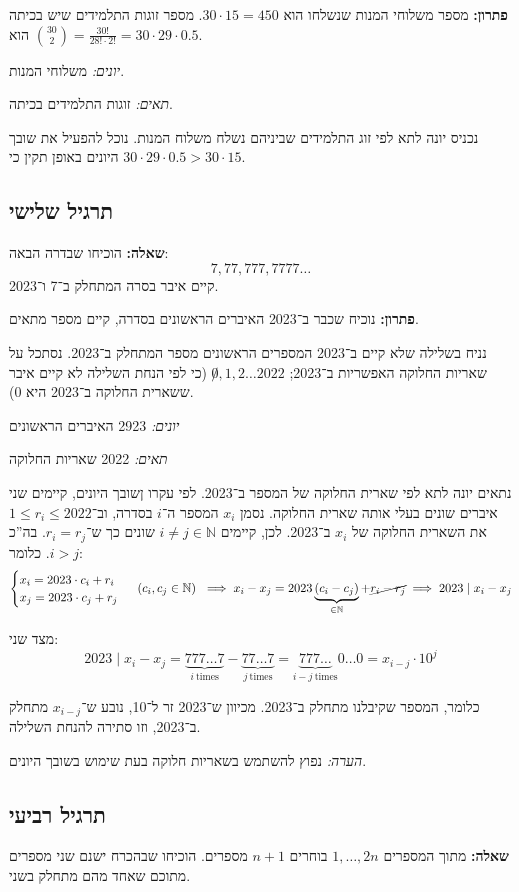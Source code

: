 \documentclass[]{article}
\newcommand\N     {\mathbb{N}}
\begin{document}
	\textbf{פתרון: }מספר משלוחי המנות שנשלחו הוא $30 \cdot 15 = 450$. מספר זוגות התלמידים שיש בכיתה הוא $\binom{30}{2} = \frac{30!}{28! \cdot 2!} = 30 \cdot 29 \cdot 0.5  $. 
	
	\textit{יונים: }משלוחי המנות.
	
	\textit{תאים: }זוגות התלמידים בכיתה. 
	
	נכניס יונה לתא לפי זוג התלמידים שביניהם נשלח משלוח המנות. נוכל להפעיל את שובך היונים באופן תקין כי $ 30 \cdot 29 \cdot 0.5 > 30 \cdot 15 $.
	
	\subsection{תרגיל שלישי}
	\textbf{שאלה: }הוכיחו שבדרה הבאה: 
	\[ 7, 77, 777, 7777 \dots \]
	קיים איבר בסרה המתחלק ב־7 ו־2023. 
	
	\textbf{פתרון: }נוכיח שכבר ב־2023 האיברים הראשונים בסדרה, קיים מספר מתאים. 
	
	נניח בשלילה שלא קיים ב־2023 המספרים הראשונים מספר המתחלק ב־2023. נסתכל על שאריות החלוקה האפשריות ב־2023; $\not 0, 1, 2 \dots 2022$ (כי לפי הנחת השלילה לא קיים איבר ששארית החלוקה ב־2023 היא 0). 
	
	\textit{יונים: }2923 האיברים הראשונים
	
	\textit{תאים: }2022 שאריות החלוקה
	
	נתאים יונה לתא לפי שארית החלוקה של המספר ב־2023. לפי עקרו ןשובך היונים, קיימים שני איברים שונים בעלי אותה שארית החלוקה. נסמן $x_i$ המספר ה־$i$ בסדרה, וב־$1 \le r_i \le 2022$ את השארית החלוקה של $x_i$ ב־2023. לכן, קיימים $i \neq j \in \N$ שונים כך ש־$r_i = r_j$. בה''כ $i > j$. כלומר: 
	\[ \begin{cases}
		x_i = 2023 \cdot c_i + r_i \\
		x_j = 2023 \cdot c_j + r_j
	\end{cases} \ (c_i, c_j \in \N) \
	\implies x_i - x_j = 2023\underbrace{(c_i - c_j)}_{\in \N} + \cancel{r_i - r_j}
	\implies 2023 \mid x_i - x_j \]
	
	מצד שני: 
	\[ 2023 \mid x_i - x_j = \underbrace{777 \dots 7}_{i \mathrm{\ times}} - \underbrace{77 \dots 7}_{j \mathrm{\ times}} = \underbrace{777 \dots}_{i - j \mathrm{\ times}} 0 \dots 0 = x_{i - j} \cdot 10^{j} \]
	
	כלומר, המספר שקיבלנו מתחלק ב־2023. מכיוון ש־2023 זר ל־10, נובע ש־$x_{i - j}$ מתחלק ב־2023, וזו סתירה להנחת השלילה. 
	
	\textit{הערה: }נפוץ להשתמש בשאריות חלוקה בעת שימוש בשובך היונים. 
	
	\subsection{תרגיל רביעי}
	\textbf{שאלה: }מתוך המספרים $1, \dots, 2n$ בוחרים $n + 1$ מספרים. הוכיחו שבהכרח ישנם שני מספרים מתוכם שאחד מהם מתחלק בשני. 
	
\end{document}
